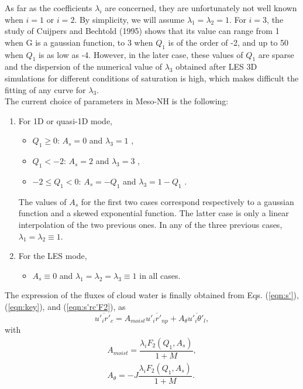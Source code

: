 As far as the coefficients ${\lambda}_{i}$ are concerned, they are unfortunately
not well known when $i = 1$ or $i = 2$.  By simplicity, we will assume
${\lambda}_{1} = {\lambda}_{2} = 1$.  For $i = 3$, the study of
Cuijpers and Bechtold (1995) shows that its value can range from 1 when G is
a gaussian function, to 3 when $Q_{1}$ is of the order of -2, and up to 50 when
$Q_{1}$ is as low as -4.  However, in the later case, these values of $Q_{1}$
are sparse and the dispersion of the numerical value of
${\lambda}_{3}$ obtained after LES 3D simulations for different conditions of
saturation is high, which makes difficult
the fitting of any curve for ${\lambda}_{3}$. \\

The current choice of parameters in Meso-NH is the following:
\begin{enumerate}
\item For 1D or quasi-1D mode,
\begin{itemize}
\item $Q_{1} \geq 0$: $A_{s} = 0$ and ${\lambda}_{3} = 1$ ,
\item $Q_{1} < -2$: $A_{s} = 2$ and ${\lambda}_{3} = 3$ ,
\item $-2 \leq Q_{1} < 0$: $A_{s} = -Q_{1}$ and ${\lambda}_{3} = 1-Q_{1}$ .
\end{itemize}
The values of $A_{s}$ for the first two cases correspond respectively to
a gaussian function and a skewed exponential function.
The latter case is only a linear interpolation of the two previous ones.  In any
of the three previous cases, $\lambda_1=\lambda_2 \equiv 1$.
\item For the LES mode,
\begin{itemize}
\item $A_{s} \equiv 0$ and
$\lambda_1=\lambda_2=\lambda_3 \equiv 1$ in all cases.
\end{itemize}
\end{enumerate}

The expression of the fluxes of cloud water is finally obtained from
Eqs. (\ref{eqn:s'}), (\ref{eqn:key}), and (\ref{eqn:s'rc'F2}), as
\begin{equation}\label{equirc}
\overline{{u'_{i}}{r'_{c}}} = A_{moist} \overline{{u'_{i}}{r'_{np}}} +
A_{\theta} \overline{{u'_{i}}{{\theta}'_{l}}},
\end{equation}
with
\begin{eqnarray}\label{ArAtheta}
A_{moist} = \dfrac {\lambda_i F_2(Q_1,A_s)} {1+M}, \\
A_{\theta} = -J \dfrac {\lambda_i F_2(Q_1,A_s)} {1+M}.
\end{eqnarray}

